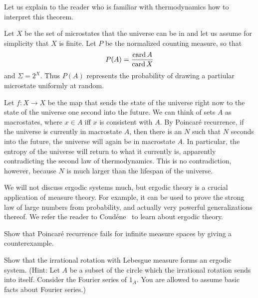 \begin{subsec}
Let us explain to the reader who is familiar with thermodynamics how to interpret this theorem.

Let $X$ be the set of microstates that the universe can be in and let us assume for simplicity that $X$ is finite.
Let $P$ be the normalized counting measure, so that
\[P(A) = \frac{\operatorname{card} A}{\operatorname{card} X}\]
and $\Sigma = 2^{X}$.
Thus $P(A)$ represents the probability of drawing a partiular microstate uniformly at random.

Let $f: X \to X$ be the map that sends the state of the universe right now to the state of the universe one second into the future.
We can think of sets $A$ as macrostates, where $x \in A$ iff $x$ is consistent with $A$.
By Poincar\'e recurrence, if the universe is currently in macrostate $A$, then there is an $N$ such that $N$ seconds into the future, the universe will again be in macrostate $A$.
In particular, the entropy of the universe will return to what it currently is, apparently contradicting the second law of thermodynamics.
This is no contradiction, however, because $N$ is much larger than the lifespan of the universe.
\end{subsec}

\begin{subsec}
We will not discuss ergodic systems much, but ergodic theory is a crucial application of measure theory.
For example, it can be used to prove the strong law of large numbers from probability, and actually very powerful generalizations thereof.
We refer the reader to Coud\'ene~\cite{coudène2016ergodic} to learn about ergodic theory.
\end{subsec}

\begin{exercise}
Show that Poincar\'e recurrence fails for infinite measure spaces by giving a counterexample.
\end{exercise}

\begin{exercise}\label{irrational rotation exercise}
Show that the irrational rotation with Lebesgue measure forms an ergodic system.
(Hint: Let $A$ be a subset of the circle which the irrational rotation sends into itself. Consider the Fourier series of $1_{A}$. You are allowed to assume basic facts about Fourier series.)
\end{exercise}

